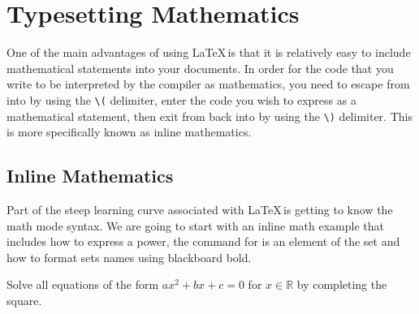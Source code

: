 \chapter{Typesetting Mathematics}

One of the main advantages of using \LaTeX\,is that it is relatively easy to
include mathematical statements into your documents.  In order for the code
that you write to be interpreted by the compiler as mathematics, you need
to escape from  into  by using the
\verb!\(! delimiter, enter the code you wish to express as a mathematical
statement, then exit from  back into  by
using the \verb!\)! delimiter. This  is more specifically
known as inline mathematics.

\section{Inline Mathematics}

Part of the steep learning curve associated with \LaTeX\,is getting to know the
math mode syntax.  We are going to start with an inline math example that
includes how to express a power, the command for is an element of the set and
how to format sets names using blackboard bold.

\begin{mhotexbox}
Solve all equations of the form \( ax^2 + bx + c = 0 \) for
\( x \in \mathbb{R} \) by completing the square.
\end{mhotexbox}

